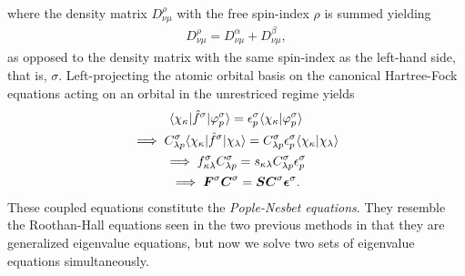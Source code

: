             where the density matrix $D^{\rho}_{\nu\mu}$ with the free
            spin-index $\rho$ is summed yielding
            \begin{align}
                D^{\rho}_{\nu\mu}
                = D^{\alpha}_{\nu\mu}
                + D^{\beta}_{\nu\mu},
            \end{align}
            as opposed to the density matrix with the same spin-index as the
            left-hand side, that is, $\sigma$.
            Left-projecting the atomic orbital basis on the canonical
            Hartree-Fock equations acting on an orbital in the unrestriced
            regime yields
            \begin{gather}
                \langle \chi_{\kappa} |\hat{f}^{\sigma}| \varphi^{\sigma}_{p} \rangle
                = \epsilon^{\sigma}_{p}
                \langle \chi_{\kappa} | \varphi^{\sigma}_{p} \rangle
                \\
                \implies
                C^{\sigma}_{\lambda p}
                \langle \chi_{\kappa} |\hat{f}^{\sigma}| \chi_{\lambda} \rangle
                = C^{\sigma}_{\lambda p} \epsilon^{\sigma}_{p}
                \langle \chi_{\kappa} | \chi_{\lambda} \rangle
                \\
                \implies
                f^{\sigma}_{\kappa \lambda}
                C^{\sigma}_{\lambda p}
                =
                s_{\kappa\lambda}
                C^{\sigma}_{\lambda p}
                \epsilon^{\sigma}_{p}
                \\
                \implies
                \boldsymbol{F}^{\sigma}
                \boldsymbol{C}^{\sigma}
                =
                \boldsymbol{S}
                \boldsymbol{C}^{\sigma}
                \boldsymbol{\epsilon}^{\sigma}.
            \end{gather}
            These coupled equations constitute the \emph{Pople-Nesbet
            equations}.
            They resemble the Roothan-Hall equations seen in the two previous
            methods in that they are generalized eigenvalue equations, but now
            we solve two sets of eigenvalue equations simultaneously.

